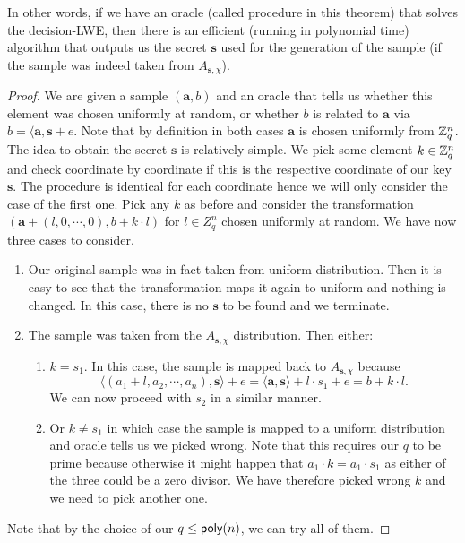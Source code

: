In other words, if we have an oracle (called procedure in this theorem) that solves the decision-LWE, then there is an efficient (running in polynomial time) algorithm that outputs us the secret $\bm{s}$ used for the generation of the sample (if the sample was indeed taken from $A_{\bm{s}, \chi}$).

\begin{proof}
	We are given a sample $(\bm{a}, b)$ and an oracle that tells us whether this element was chosen uniformly at random, or whether $b$ is related to $\bm{a}$ via $b = \langle \bm{a}, \bm{s} + e$. Note that by definition in both cases $\bm{a}$ is chosen uniformly from $\mathbb{Z}_q^n$. The idea to obtain the secret $\bm{s}$ is relatively simple. We pick some element $k \in \mathbb{Z}_q^n$ and check coordinate by coordinate if this is the respective coordinate of our key $\bm{s}$. The procedure is identical for each coordinate hence we will only consider the case of the first one. Pick any $k$ as before and consider the transformation $(\bm{a} + (l, 0, \cdots, 0), b +k \cdot l)$ for $l\in Z_q^n$ chosen uniformly at random. We have now three cases to consider.
	\begin{enumerate}
		\item Our original sample was in fact taken from uniform distribution. Then it is easy to see that the transformation maps it again to uniform and nothing is changed. In this case, there is no $\bm{s}$ to be found and we terminate.
		\item The sample was taken from the $A_{\bm{s}, \chi}$ distribution. Then either:
			\begin{enumerate}
				\item $k = s_1$. In this case, the sample is mapped back to $A_{\bm{s}, \chi}$ because \[ \langle (a_1 + l, a_2, \cdots, a_n), \bm{s} \rangle + e = \langle \bm{a}, \bm{s} \rangle + l \cdot s_1 + e = b + k \cdot l.\] We can now proceed with $s_2$ in a similar manner.
				\item Or $k \neq s_1$ in which case the sample is mapped to a uniform distribution and oracle tells us we picked wrong. Note that this requires our $q$ to be prime because otherwise it might happen that $a_1 \cdot k = a_1 \cdot s_1$ as either of the three could be a zero divisor. We have therefore picked wrong $k$ and we need to pick another one.
			\end{enumerate}
	\end{enumerate}
	Note that by the choice of our $q \leq \alg{poly}(n)$, we can try all of them.
\end{proof}

